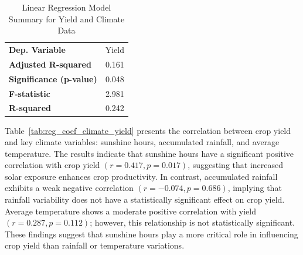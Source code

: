 \begin{table}[htbp]
    \centering
    \caption{Linear Regression Model Summary for Yield and Climate Data}
    \label{tab:reg_summary_climate_yield}
    \begin{tabular}{@{}lc@{}}
        \toprule
        \textbf{Dep. Variable} & Yield \\
        \textbf{Adjusted R-squared} & 0.161 \\
        \textbf{Significance (p-value)} & 0.048 \\
        \textbf{F-statistic} & 2.981 \\
        \textbf{R-squared} & 0.242 \\
        \bottomrule
    \end{tabular}
\end{table}

\begin{table}[htbp]
    \centering
    \caption{Regression Coefficients for Yield and Climate Data}
    \label{tab:reg_coef_climate_yield}
\end{table}





Table~\ref{tab:reg_coef_climate_yield} presents the correlation between crop yield and key climate variables: sunshine hours, accumulated rainfall, and average temperature.  The results indicate that sunshine hours have a significant positive correlation with crop yield $(r=0.417,p=0.017)$, suggesting that increased solar exposure enhances crop productivity. In contrast, accumulated rainfall exhibits a weak negative correlation $(r=-0.074,p=0.686)$, implying that rainfall variability does not have a statistically significant effect on crop yield. Average temperature shows a moderate positive correlation with yield $(r=0.287,p=0.112)$; however, this relationship is not statistically significant. These findings suggest that sunshine hours play a more critical role in influencing crop yield than rainfall or temperature variations.


